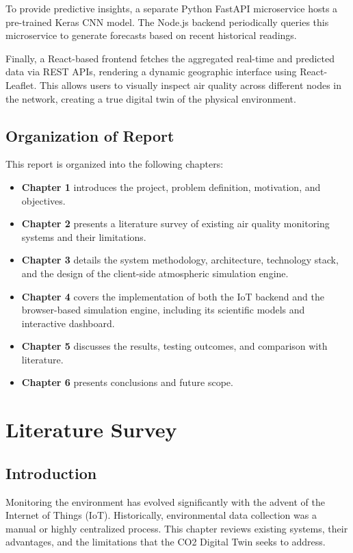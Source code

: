 \documentclass[a4paper, 12pt]{report}
\begin{document}
To provide predictive insights, a separate Python FastAPI microservice hosts a pre-trained Keras CNN model. The Node.js backend periodically queries this microservice to generate forecasts based on recent historical readings.

Finally, a React-based frontend fetches the aggregated real-time and predicted data via REST APIs, rendering a dynamic geographic interface using React-Leaflet. This allows users to visually inspect air quality across different nodes in the network, creating a true digital twin of the physical environment.

\section{Organization of Report}
This report is organized into the following chapters:
\begin{itemize}
	\item \textbf{Chapter 1} introduces the project, problem definition, motivation, and objectives.
	\item \textbf{Chapter 2} presents a literature survey of existing air quality monitoring systems and their limitations.
	\item \textbf{Chapter 3} details the system methodology, architecture, technology stack, and the design of the client-side atmospheric simulation engine.
	\item \textbf{Chapter 4} covers the implementation of both the IoT backend and the browser-based simulation engine, including its scientific models and interactive dashboard.
	\item \textbf{Chapter 5} discusses the results, testing outcomes, and comparison with literature.
	\item \textbf{Chapter 6} presents conclusions and future scope.
\end{itemize}

\chapter{Literature Survey}

\section{Introduction}
Monitoring the environment has evolved significantly with the advent of the Internet of Things (IoT). Historically, environmental data collection was a manual or highly centralized process. This chapter reviews existing systems, their advantages, and the limitations that the CO2 Digital Twin seeks to address.
\end{document}

